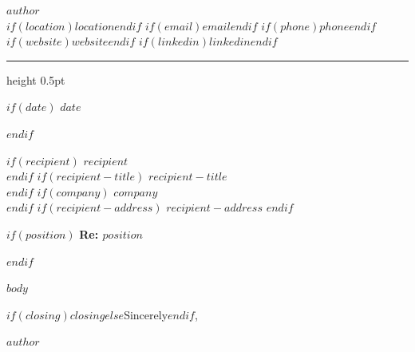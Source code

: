 \documentclass[11pt,letterpaper]{article}
\newcommand{\sep}{\enspace{\color{rulecolor}\textbullet}\enspace}
\begin{document}
\begin{flushleft}
  {\large\bfseries\color{headingcolor} $author$}\\[0.15em]
  {\small\color{mutedcolor}
    $if(location)$$location$$endif$%
    $if(email)$\sep\href{mailto:$email$}{$email$}$endif$%
    $if(phone)$\sep$phone$$endif$%
    $if(website)$\sep\href{https://$website$}{$website$}$endif$%
    $if(linkedin)$\sep\href{https://$linkedin$}{$linkedin$}$endif$%
  }
\end{flushleft}

\vspace{0.3em}
{\color{rulecolor}\hrule height 0.5pt}
\vspace{1.2em}

$if(date)$
$date$

$endif$

$if(recipient)$
$recipient$\\
$endif$
$if(recipient-title)$
$recipient-title$\\
$endif$
$if(company)$
$company$\\
$endif$
$if(recipient-address)$
$recipient-address$
$endif$

$if(position)$
\textbf{Re: $position$}

$endif$

$body$

\vspace{1.5em}
$if(closing)$$closing$$else$Sincerely$endif$,

\vspace{2.5em}
$author$
\end{document}
